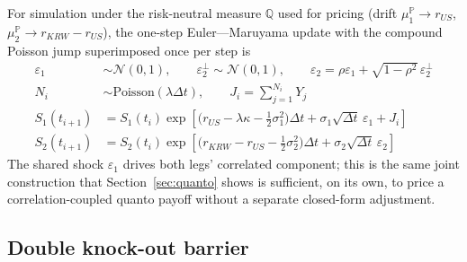 \documentclass[11pt,a4paper]{article}
\begin{document}
For simulation under the risk-neutral measure $\mathbb Q$ used for pricing (drift $\mu_1^{\mathbb P}\to r_{US}$, $\mu_2^{\mathbb P}\to r_{KRW}-r_{US}$), the one-step Euler---Maruyama update with the compound Poisson jump superimposed once per step is
\begin{align}
\varepsilon_1 &\sim\mathcal N(0,1), \qquad \varepsilon_2^{\perp}\sim\mathcal N(0,1), \qquad \varepsilon_2 = \rho\varepsilon_1+\sqrt{1-\rho^2}\,\varepsilon_2^{\perp} \\
N_i &\sim\mathrm{Poisson}(\lambda\Delta t), \qquad J_i = \sum_{j=1}^{N_i}Y_j \\
S_1(t_{i+1}) &= S_1(t_i)\exp\!\left[\Big(r_{US}-\lambda\kappa-\tfrac12\sigma_1^2\Big)\Delta t+\sigma_1\sqrt{\Delta t}\,\varepsilon_1+J_i\right] \\
S_2(t_{i+1}) &= S_2(t_i)\exp\!\left[\Big(r_{KRW}-r_{US}-\tfrac12\sigma_2^2\Big)\Delta t+\sigma_2\sqrt{\Delta t}\,\varepsilon_2\right]
\end{align}
The shared shock $\varepsilon_1$ drives both legs' correlated component; this is the same joint construction that Section~\ref{sec:quanto} shows is sufficient, on its own, to price a correlation-coupled quanto payoff without a separate closed-form adjustment.

\subsection{Double knock-out barrier}
\label{sec:barrier}
\end{document}
